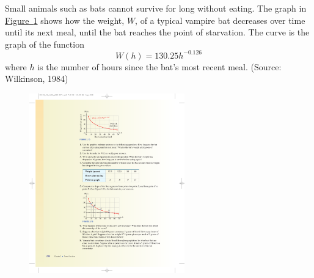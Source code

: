 \documentclass[10pt,]{book}
\theoremstyle{plain}
\theoremstyle{definition}
\theoremstyle{definition}
\theoremstyle{definition}
\theoremstyle{definition}
\theoremstyle{definition}
\numberwithin{equation}{section}
\begin{document}
    Small animals such as bats cannot survive for long without eating. The graph in \hyperref[fig-vampire-bats]{Figure~\ref{fig-vampire-bats}} shows how the weight, \(W\), of a typical vampire bat decreases over time until its next meal, until the bat reaches the point of starvation. The curve is the graph of the function
    \begin{equation*}W(h) = 130.25h^{−0.126}\end{equation*}
    where \(h\) is the number of hours since the bat’s most recent meal. (Source: Wilkinson, 1984)
%
\leavevmode%
\begin{figure}
\centering
\includegraphics[width=0.60\textwidth,]{images/fig-vampire-bats.pdf}\caption{\label{fig-vampire-bats}}
\end{figure}
\leavevmode%
\end{document}

